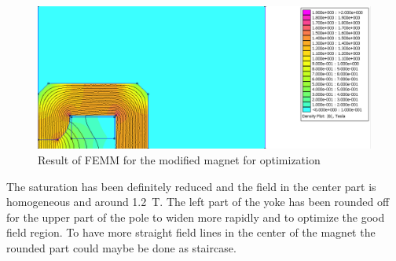 \documentclass[10pt,a4paper,noendnumber=true]{scrartcl}
\begin{document}
\begin{figure}[H]
    \centering
\includegraphics[width=1 \textwidth]{magnet_OP.png} 
\caption{Result of FEMM for the modified magnet for optimization}
\label{FEMM2}
\end{figure} 

The saturation has been definitely reduced and the field in the center part is homogeneous and around \SI{1.2}{\tesla}. The left part of the yoke has been rounded off for the upper part of the pole to widen more rapidly and to optimize the good field region. To have more straight field lines in the center of the magnet the rounded part could maybe be done as staircase.
\end{document}
